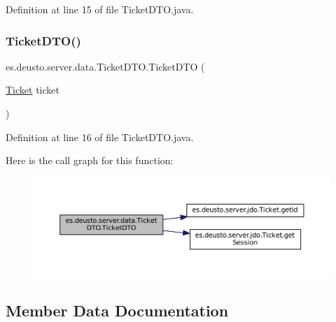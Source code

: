 Definition at line 15 of file Ticket\+D\+T\+O.\+java.

\mbox{\label{classes_1_1deusto_1_1server_1_1data_1_1_ticket_d_t_o_ad3d32eef4ab6ad5ea98cc7aa35d3de50}} 
\subsubsection{\texorpdfstring{TicketDTO()}{TicketDTO()}\hspace{0.1cm}{\footnotesize\ttfamily [2/2]}}
{\footnotesize\ttfamily es.\+deusto.\+server.\+data.\+Ticket\+D\+T\+O.\+Ticket\+D\+TO (\begin{DoxyParamCaption}\item[{\mbox{\hyperlink{classes_1_1deusto_1_1server_1_1jdo_1_1_ticket}{Ticket}}}]{ticket }\end{DoxyParamCaption})}



Definition at line 16 of file Ticket\+D\+T\+O.\+java.

Here is the call graph for this function\+:
\nopagebreak
\begin{figure}[H]
\begin{center}
\leavevmode
\includegraphics[width=350pt]{classes_1_1deusto_1_1server_1_1data_1_1_ticket_d_t_o_ad3d32eef4ab6ad5ea98cc7aa35d3de50_cgraph}
\end{center}
\end{figure}


\subsection{Member Data Documentation}
\mbox{\label{classes_1_1deusto_1_1server_1_1data_1_1_ticket_d_t_o_a1602514fbada31dc44edc01bf359c401}} 
